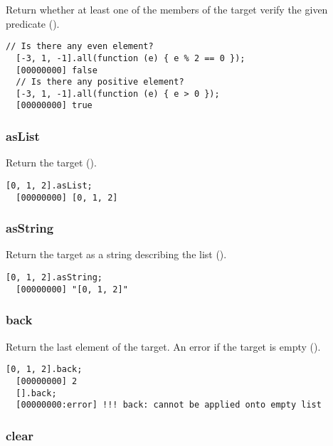 Return whether at least one of the members of the target verify the
given predicate ().

\begin{lstlisting}[caption=List.any, label=lst:list-any, float=\floatposh]
  // Is there any even element?
  [-3, 1, -1].all(function (e) { e % 2 == 0 });
  [00000000] false
  // Is there any positive element?
  [-3, 1, -1].all(function (e) { e > 0 });
  [00000000] true
\end{lstlisting}

\subsubsection{asList}

Return the target ().

\begin{lstlisting}[caption=List.asList, label=lst:list-asList, float=\floatposh]
  [0, 1, 2].asList;
  [00000000] [0, 1, 2]
\end{lstlisting}

\subsubsection{asString}

Return the target as a string describing the list
().

\begin{lstlisting}[caption=List.asString, label=lst:list-asString, float=\floatposh]
  [0, 1, 2].asString;
  [00000000] "[0, 1, 2]"
\end{lstlisting}

\subsubsection{back}

Return the last element of the target. An error if the target is empty
().

\begin{lstlisting}[caption=List.back, label=lst:list-back, float=\floatposh]
  [0, 1, 2].back;
  [00000000] 2
  [].back;
  [00000000:error] !!! back: cannot be applied onto empty list
\end{lstlisting}

\subsubsection{clear}

